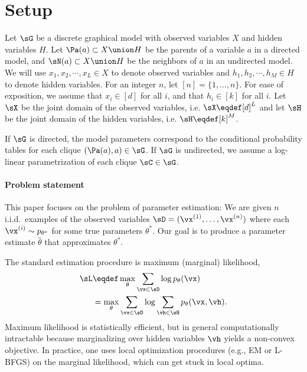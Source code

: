 \section{Setup}
\label{sec:setup}

Let $\sG$ be a discrete graphical model with observed variables $X$ and
  hidden variables $H$.
Let $\Pa(a) \subset X \union H$ be the parents of a variable $a$ in a directed
  model, and $\sN(a) \subset X \union H$ be the neighbors of $a$ in an
  undirected model.
We will use $x_1, x_2, \cdots, x_L \in X$ to denote observed variables and
  $h_1, h_2, \cdots, h_M \in H$ to denote hidden variables.
For an integer $n$, let $[n] = \{ 1, \dots, n \}$.
For ease of exposition, we assume that $x_i \in [d]$ for
all $i$, and that $h_i \in [k]$ for all $i$.
Let $\sX$ be the joint domain of the observed variables, i.e. $\sX \eqdef [d]^L$ and
let $\sH$ be the joint domain of the hidden variables, i.e. $\sH \eqdef [k]^M$.

If $\sG$ is directed, the model parameters correspond to
the conditional probability tables for each clique $(\Pa(a), a) \in \sG$.
If $\sG$ is undirected, we assume a log-linear parametrization of each clique $\sC \in \sG$.

\paragraph{Problem statement}

This paper focuses on the problem of parameter estimation:
We are given $n$ i.i.d.~examples of the observed variables $\sD
  = (\vx^{(1)}, \dots, \vx^{(n)})$ where each $\vx^{(i)} \sim p_{\theta^*}$ for
  some true parameters $\theta^*$.
Our goal is to produce a parameter estimate $\hat\theta$ that
  approximates $\theta^*$.

The standard estimation procedure is maximum (marginal) likelihood,
  \begin{align*}
    \sL &\eqdef \max_{\theta} \sum_{\vx \in \sD} \log p_\theta(\vx) \\
        &=      \max_{\theta} \sum_{\vx \in \sD} \log \sum_{\vh \in \sH} p_\theta(\vx,\vh).
  \end{align*}
  Maximum likelihood is statistically efficient,
  but in general computationally intractable
  because marginalizing over hidden variables $\vh$ yields a non-convex objective.
In practice, one uses local optimization procedures (e.g., EM
  or L-BFGS) on the marginal likelihood, which can get stuck in local
  optima.

